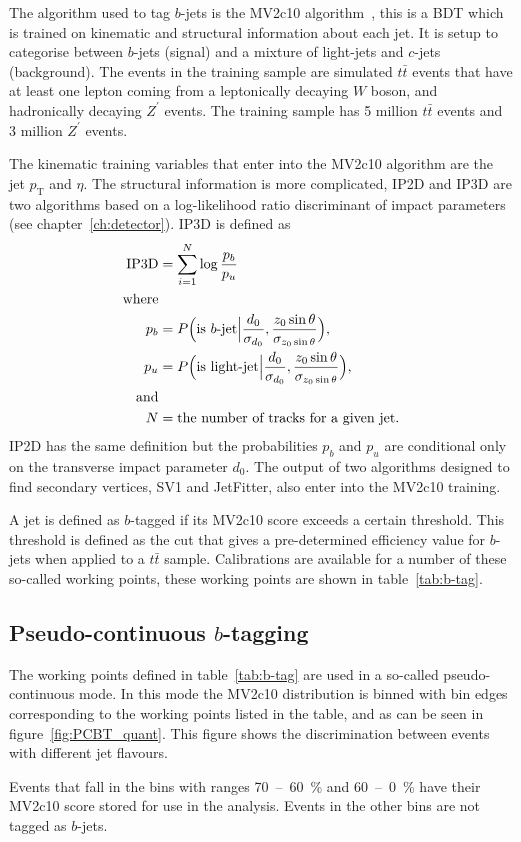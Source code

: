 The algorithm used to tag $b$-jets is the MV2c10 algorithm~\cite{mv2c10}, this
is a BDT which is trained on kinematic and structural information about each
jet. It is setup to categorise between $b$-jets (signal) and a mixture of
light-jets and $c$-jets (background). The events in the training sample are
simulated $t\bar{t}$ events that have at least one lepton coming from a
leptonically decaying $W$ boson, and hadronically decaying $Z^\prime$ events.
The training sample has 5 million $t\bar{t}$ events and 3 million $Z^\prime$
events.

The kinematic training variables that enter into the MV2c10 algorithm are
the jet $p_{\mathrm{T}}$ and $\eta$. The structural information is more complicated, IP2D
and IP3D are two algorithms based on a log-likelihood ratio discriminant of
impact parameters (see chapter~\ref{ch:detector}). IP3D is defined as
\begin{align}
  \text{IP3D} &=\sum_{i=1}^{N}\log{\frac{p_b}{p_u}} \\
  \text{where}& \notag \\
  p_b &= P\Big(\text{is }b\text{-jet} \Big\vert \frac{d_0}{\sigma_{d_0}},
        \frac{z_0 \sin{\theta}}{\sigma_{z_0\sin{\theta}}}\Big),\\
  p_u &= P\Big(\text{is light-jet} \Big\vert \frac{d_0}{\sigma_{d_0}},
        \frac{z_0 \sin{\theta}}{\sigma_{z_0\sin{\theta}}}\Big),\\
  \text{and} & \notag \\
  N &= \text{the number of tracks for a given jet.} \notag
\end{align}
IP2D has the same definition but the probabilities $p_b$ and $p_u$ are
conditional only on the transverse impact parameter $d_0$. The output of two
algorithms designed to find secondary vertices, SV1 and JetFitter, also enter
into the MV2c10 training.

A jet is defined as $b$-tagged if its MV2c10 score exceeds a certain threshold. This
threshold is defined as the cut that gives a pre-determined efficiency value for
$b$-jets when applied to a $t\bar{t}$ sample. Calibrations are available for a
number of these so-called working points, these working points are shown in
table~\ref{tab:b-tag}.


\subsection{Pseudo-continuous $b$-tagging}
The working points defined in table~\ref{tab:b-tag} are used in a so-called
pseudo-continuous mode. In this mode the MV2c10 distribution is binned with bin
edges corresponding to the working points listed in the table, and as can be
seen in figure~\ref{fig:PCBT_quant}. This figure shows the discrimination between
events with different jet flavours. 

Events that fall in the bins with ranges 70~--~60~\% and 60~--~0~\% have their
MV2c10 score stored for use in the analysis. Events in the other bins are not
tagged as $b$-jets.

